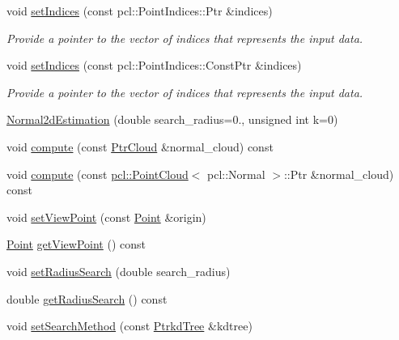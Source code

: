 \begin{DoxyCompactItemize}
void \hyperlink{classNormal2dEstimation_a91bb44f43f09aa33f3c447cfe2cde6b3}{set\+Indices} (const pcl\+::\+Point\+Indices\+::\+Ptr \&indices)
\begin{DoxyCompactList}\small\item\em Provide a pointer to the vector of indices that represents the input data. \end{DoxyCompactList}\item 
void \hyperlink{classNormal2dEstimation_a57a561d5d51d42584687dd4a3d29defd}{set\+Indices} (const pcl\+::\+Point\+Indices\+::\+Const\+Ptr \&indices)
\begin{DoxyCompactList}\small\item\em Provide a pointer to the vector of indices that represents the input data. \end{DoxyCompactList}\item 
\hyperlink{classNormal2dEstimation_ac93035a8de2a45651571f7f6022f18b7}{Normal2d\+Estimation} (double search\+\_\+radius=0., unsigned int k=0)
\item 
void \hyperlink{classNormal2dEstimation_a908d3a85cda5b29bb3ef119ab30d6ab6}{compute} (const \hyperlink{Normal2dEstimation_8h_a2894055ff89c63cbae90e22dfddaa610}{Ptr\+Cloud} \&normal\+\_\+cloud) const
\item 
void \hyperlink{classNormal2dEstimation_ac3fd17679a20a7f4faab72f58fdc6199}{compute} (const \hyperlink{test0426_8cc_a6c737bbce051bc4690e4c608adc2deec}{pcl\+::\+Point\+Cloud}$<$ pcl\+::\+Normal $>$\+::Ptr \&normal\+\_\+cloud) const
\item 
void \hyperlink{classNormal2dEstimation_ad05b65f35c4aa0b1511bf81e5a70b36d}{set\+View\+Point} (const \hyperlink{Normal2dEstimation_8h_ab8d898f36957cca40634530a6f118a3e}{Point} \&origin)
\item 
\hyperlink{Normal2dEstimation_8h_ab8d898f36957cca40634530a6f118a3e}{Point} \hyperlink{classNormal2dEstimation_a9a8b5ac0f03023a476f7986cf06c8f96}{get\+View\+Point} () const
\item 
void \hyperlink{classNormal2dEstimation_aebdbc9d5d5cabd269522f42af9d1552f}{set\+Radius\+Search} (double search\+\_\+radius)
\item 
double \hyperlink{classNormal2dEstimation_a2b25a3efe493da9995622279e3a21437}{get\+Radius\+Search} () const
\item 
void \hyperlink{classNormal2dEstimation_a87261649c17ea4f561da89066591a900}{set\+Search\+Method} (const \hyperlink{Normal2dEstimation_8h_a8b809d6f98757c822d529e8f675940cd}{Ptrkd\+Tree} \&kdtree)
\item 

\end{DoxyCompactItemize}
